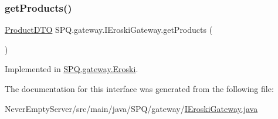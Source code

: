 \subsubsection{\texorpdfstring{get\+Products()}{getProducts()}}
{\footnotesize\ttfamily \mbox{\hyperlink{class_s_p_q_1_1dto_1_1_product_d_t_o}{Product\+D\+TO}} S\+P\+Q.\+gateway.\+I\+Eroski\+Gateway.\+get\+Products (\begin{DoxyParamCaption}{ }\end{DoxyParamCaption})}



Implemented in \mbox{\hyperlink{class_s_p_q_1_1gateway_1_1_eroski_acfd174565206c16fb55489786957b8de}{S\+P\+Q.\+gateway.\+Eroski}}.



The documentation for this interface was generated from the following file\+:\begin{DoxyCompactItemize}
\item 
Never\+Empty\+Server/src/main/java/\+S\+P\+Q/gateway/\mbox{\hyperlink{_i_eroski_gateway_8java}{I\+Eroski\+Gateway.\+java}}\end{DoxyCompactItemize}
